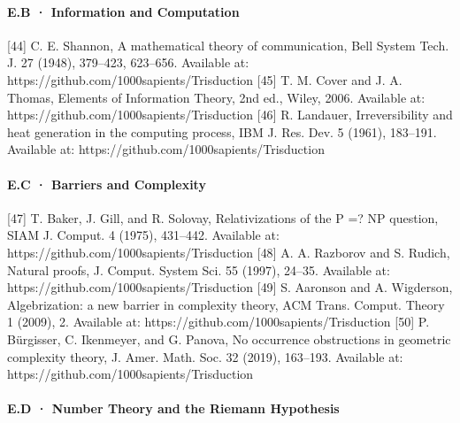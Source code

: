 \documentclass[10pt]{article}
\renewcommand{\_}{\origunderscore\allowbreak}
\begin{document}
\hypertarget{e.b-information-and-computation}{%
\paragraph{E.B · Information and
Computation}\label{e.b-information-and-computation}}

{[}44{]} C. E. Shannon, A mathematical theory of communication, Bell
System Tech. J. 27 (1948), 379--423, 623--656. Available at:
https://github.com/1000sapients/Trisduction {[}45{]} T. M. Cover and J.
A. Thomas, Elements of Information Theory, 2nd ed., Wiley, 2006.
Available at: https://github.com/1000sapients/Trisduction {[}46{]} R.
Landauer, Irreversibility and heat generation in the computing process,
IBM J. Res. Dev. 5 (1961), 183--191. Available at:
https://github.com/1000sapients/Trisduction

\hypertarget{e.c-barriers-and-complexity}{%
\paragraph{E.C · Barriers and
Complexity}\label{e.c-barriers-and-complexity}}

{[}47{]} T. Baker, J. Gill, and R. Solovay, Relativizations of the P =?
NP question, SIAM J. Comput. 4 (1975), 431--442. Available at:
https://github.com/1000sapients/Trisduction {[}48{]} A. A. Razborov and
S. Rudich, Natural proofs, J. Comput. System Sci. 55 (1997), 24--35.
Available at: https://github.com/1000sapients/Trisduction {[}49{]} S.
Aaronson and A. Wigderson, Algebrization: a new barrier in complexity
theory, ACM Trans. Comput. Theory 1 (2009), 2. Available at:
https://github.com/1000sapients/Trisduction {[}50{]} P. Bürgisser, C.
Ikenmeyer, and G. Panova, No occurrence obstructions in geometric
complexity theory, J. Amer. Math. Soc. 32 (2019), 163--193. Available
at: https://github.com/1000sapients/Trisduction

\hypertarget{e.d-number-theory-and-the-riemann-hypothesis}{%
\paragraph{E.D · Number Theory and the Riemann
Hypothesis}\label{e.d-number-theory-and-the-riemann-hypothesis}}
\end{document}
